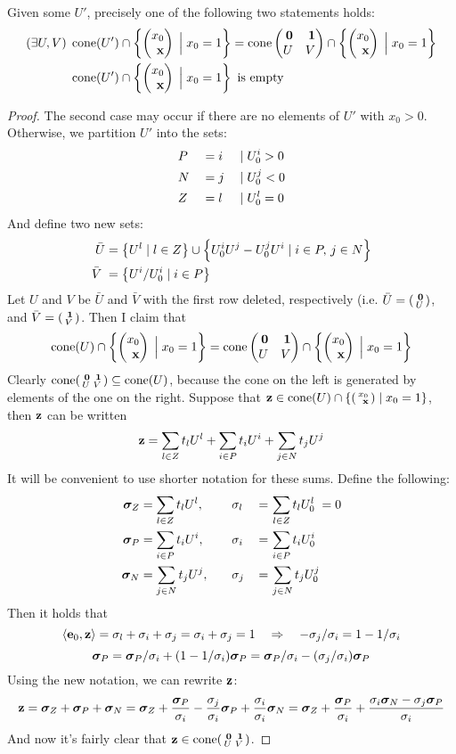 \begin{Prop}\label{vcone_to_vpoly}
	Given some $U'$, precisely one of the following two statements holds:
	\begin{align*}
    (\exists U,V)\;&\cone(U') \cap \hpxz = 
        \cone\pmb \0 & \1 \\ U & V \pme \cap \hpxz \\
  &\cone(U') \cap \hpxz \text{ is empty}
  \end{align*}
\end{Prop}

\begin{proof}
  The second case may occur if there are no elements of $U'$ with $x_0 > 0$.  Otherwise, we partition $U'$ into the sets:
	\begin{alignat*}{3}
		 & P &  & = i & \;|\; & U^i_{0} > 0 \\
		 & N &  & = j & \;|\; & U^j_{0} < 0 \\
		 & Z &  & = l & \;|\; & U^l_{0} = 0
	\end{alignat*}
	And define two new sets:
	\begin{align*}
		\bar U   & = \left\{U^l \;|\; l \in Z\right\} \cup \left\{U^i_{0} U^j - U^j_{0} U^i \;|\; i\in P,\, j\in N\right\} \\
		\bar V\; & = \left\{U^i/U^i_{0} \;|\; i \in P\right\}
	\end{align*}
  Let $U$ and $V$ be $\bar U$ and $\bar V$ with the first row deleted, respectively (i.e. $\bar U = \psmb\0\\ U\psme$, and $\bar V = \psmb\1\\ V\psme$.  Then I claim that
	\[ \cone(U) \cap \hpxz = \cone\pmb \0 & \1 \\ U & V \pme \cap \hpxz\]
  Clearly $\cone\psmb \0 & \1 \\ U & V \psme \subseteq \cone(U)$, because the cone on the left is generated by elements of the one on the right.  Suppose that $\z \in \cone(U) \cap \shpxz$, then $\mathbf{z}$ can be written
	\[ \mathbf{z} = \sum_{l\in Z} t_l U^l + \sum_{i\in P} t_i U^i + \sum_{j\in N} t_j U^j \]
	It will be convenient to use shorter notation for these sums.  Define the following:
	\begin{alignat*}{3}
		\bm{\sigma}_Z & = \sum_{l\in Z} t_l U^l, \quad &  & \sigma_l \, & = & \, \sum_{l\in Z} t_l U^l_{0} \;= 0 \\
		\bm{\sigma}_P & = \sum_{i\in P} t_i U^i, \quad &  & \sigma_i \, & = & \, \sum_{i\in P} t_i U^i_{0}       \\
		\bm{\sigma}_N & = \sum_{j\in N} t_j U^j, \quad &  & \sigma_j \, & = & \, \sum_{j\in N} t_j U^j_{0}
	\end{alignat*}
	Then it holds that
	\[ \left\langle \mathbf{e}_0, \mathbf{z} \right\rangle = \sigma_l + \sigma_i + \sigma_j = \sigma_i + \sigma_j = 1
		\quad\Rightarrow\quad -\sigma_j/\sigma_i = 1 - 1/\sigma_i \]
	\[ \bm{\sigma}_P = \bm{\sigma}_P/\sigma_i + (1-1/\sigma_i)\bm{\sigma}_P
		= \bm{\sigma}_P/\sigma_i - (\sigma_j/\sigma_i)\bm{\sigma}_P \]
	Using the new notation, we can rewrite $\mathbf{z}$:
	\[ \mathbf{z} = \bm{\sigma}_Z + \bm{\sigma}_P + \bm{\sigma}_N
		= \bm{\sigma}_Z + \frac{\bm{\sigma}_P}{\sigma_i} - \frac{\sigma_j}{\sigma_i}\bm{\sigma}_P
		+ \frac{\sigma_i}{\sigma_i}\bm{\sigma}_N
		= \bm{\sigma}_Z + \frac{\bm{\sigma}_P}{\sigma_i} +
		\frac{\sigma_i\bm{\sigma}_N - \sigma_j\bm{\sigma}_P}{\sigma_i}
	\]
  And now it's fairly clear that $\z \in \cone\psmb \0 & \1 \\ U & V \psme$.
\end{proof}

